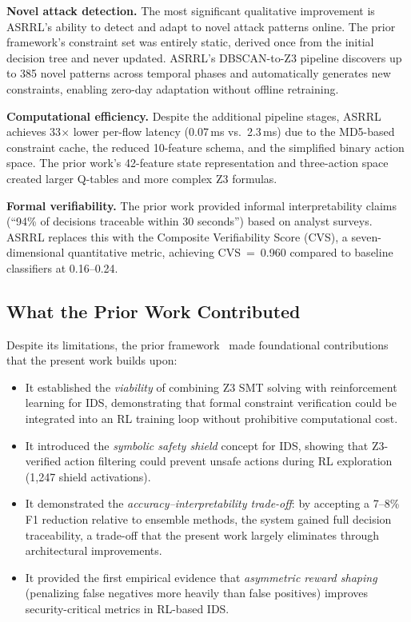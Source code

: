 \documentclass[12pt, letterpaper, oneside]{report}
\newcommand{\ASRRL}{\textsc{ASRRL}}
\begin{document}
\textbf{Novel attack detection.} The most significant qualitative improvement is \ASRRL{}'s ability to detect and adapt to novel attack patterns online. The prior framework's constraint set was entirely static, derived once from the initial decision tree and never updated. \ASRRL{}'s DBSCAN-to-Z3 pipeline discovers up to 385 novel patterns across temporal phases and automatically generates new constraints, enabling zero-day adaptation without offline retraining.

\textbf{Computational efficiency.} Despite the additional pipeline stages, \ASRRL{} achieves 33$\times$ lower per-flow latency (0.07\,ms vs.\ 2.3\,ms) due to the MD5-based constraint cache, the reduced 10-feature schema, and the simplified binary action space. The prior work's 42-feature state representation and three-action space created larger Q-tables and more complex Z3 formulas.

\textbf{Formal verifiability.} The prior work provided informal interpretability claims (``94\% of decisions traceable within 30 seconds'') based on analyst surveys. \ASRRL{} replaces this with the Composite Verifiability Score (CVS), a seven-dimensional quantitative metric, achieving CVS~=~0.960 compared to baseline classifiers at 0.16--0.24.

\subsection{What the Prior Work Contributed}

Despite its limitations, the prior framework~\citep{young2025adaptive} made foundational contributions that the present work builds upon:
\begin{itemize}
    \item It established the \emph{viability} of combining Z3 SMT solving with reinforcement learning for IDS, demonstrating that formal constraint verification could be integrated into an RL training loop without prohibitive computational cost.
    \item It introduced the \emph{symbolic safety shield} concept for IDS, showing that Z3-verified action filtering could prevent unsafe actions during RL exploration (1,247 shield activations).
    \item It demonstrated the \emph{accuracy--interpretability trade-off}: by accepting a 7--8\% F1 reduction relative to ensemble methods, the system gained full decision traceability, a trade-off that the present work largely eliminates through architectural improvements.
    \item It provided the first empirical evidence that \emph{asymmetric reward shaping} (penalizing false negatives more heavily than false positives) improves security-critical metrics in RL-based IDS.
\end{itemize}
\end{document}
